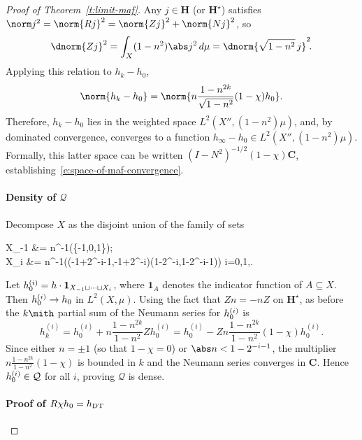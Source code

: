\documentclass[10pt]{article}
\theoremstyle{plain}
\theoremstyle{definition}
\theoremstyle{remark}
\numberwithin{theorem}{section}
\numberwithin{example}{section}
\numberwithin{equation}{section}
\numberwithin{figure}{section}
\newcommand\DT{\ensuremath{_{\text{\normalfont DT}}}}		%
\begin{document}
\begin{proof}[Proof of Theorem~\ref{t:limit-maf}]
Any $j\in\mathbf H$ (or $\mathbf H^\star$) satisfies $\norm j^2 = \norm{Rj}^2=\norm{Zj}^2+\norm{Nj}^2$, so
\begin{equation}
	\dnorm{Zj}^2 = \int_X (1-n^2)\abs j^2\,d\mu = \dnorm{\sqrt{1-n^2}\,j}^2\!.
\end{equation}
Applying this relation to $h_k-h_0$,
\begin{equation}
	\norm{h_k-h_0} = \norm{n\frac{1-n^{2k}}{\sqrt{1-n^2}}(1-\chi) h_0}.
\end{equation}
Therefore, $h_k-h_0$ lies in the weighted space $L^2(X'',(1-n^2)\mu)$, and, by dominated convergence, converges to a function $h_\infty-h_0\in L^2(X'',(1-n^2)\mu)$. Formally, this latter space can be written $(I-N^2)^{-1/2} (1-\chi) \mathbf C$, establishing~\eqref{e:space-of-maf-convergence}.


\paragraph{Density of $\mathcal Q$}

Decompose $X$ as the disjoint union of the family of sets
%
%
\begin{nalign}
	X_{-1}	&= n^{-1}(\{-1,0,1\});\\
	X_i		&= n^{-1}((-1+2^{-i-1},-1+2^{-i})\cup(1-2^{-i},1-2^{-i-1})) \qquad i=0,1,\dotsb.
\end{nalign}
%
%
Let $h_0^{\smash{(i)}}=h\cdot\mathbf 1_{X_{-1}\sqcup\dotsb\sqcup X_i}$, where $\mathbf 1_A$ denotes the indicator function of $A\subseteq X$. Then $h_0^{\smash{(i)}}\to h_0$ in $L^2(X,\mu)$. Using the fact that $Zn=-nZ$ on $\mathbf H^\star$, as before the $k\mith$ partial sum of the Neumann series for $h_0^{\smash{(i)}}$ is
%
%
\begin{equation}
	h^{(i)}_k = h^{(i)}_0 + n\frac{1-n^{2k}}{1-n^2} Zh^{(i)}_0
		= h^{(i)}_0 - Zn\frac{1-n^{2k}}{1-n^2} (1-\chi) h^{(i)}_0.
\end{equation}
%
%
Since either $n=\pm1$ (so that $1-\chi=0$) or $\abs n<1-2^{-i-1}$, the multiplier $n\frac{1-n^{2k}}{1-n^2} (1-\chi)$ is bounded in $k$ and the Neumann series converges in $\mathbf C$. Hence $h^{\smash{(i)}}_0\in\mathcal Q$ for all $i$, proving $\mathcal Q$ is dense.

\paragraph{Proof of $R \chi h_0=h\DT$}


\end{proof}
\end{document}
